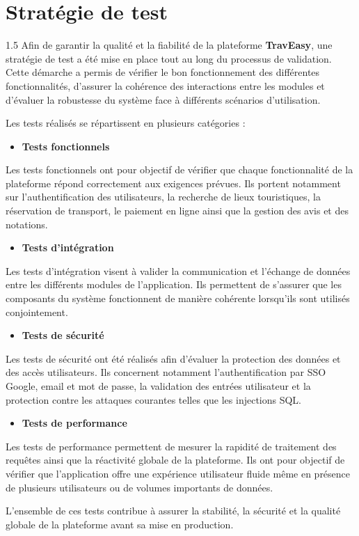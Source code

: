 \documentclass[a4paper,12pt]{report}
\begin{document}
\section{Stratégie de test}
\vspace{0.5cm}
\begin{spacing}{1.5}
\justifying
Afin de garantir la qualité et la fiabilité de la plateforme \textbf{TravEasy}, une stratégie de test a été mise en place tout au long du processus de validation. Cette démarche a permis de vérifier le bon fonctionnement des différentes fonctionnalités, d'assurer la cohérence des interactions entre les modules et d'évaluer la robustesse du système face à différents scénarios d'utilisation.

Les tests réalisés se répartissent en plusieurs catégories :

\begin{itemize}
    \item \textbf{Tests fonctionnels}
\end{itemize}
Les tests fonctionnels ont pour objectif de vérifier que chaque fonctionnalité de la plateforme répond correctement aux exigences prévues. Ils portent notamment sur l'authentification des utilisateurs, la recherche de lieux touristiques, la réservation de transport, le paiement en ligne ainsi que la gestion des avis et des notations.
\begin{itemize}
    \item \textbf{Tests d'intégration}
\end{itemize}
Les tests d'intégration visent à valider la communication et l'échange de données entre les différents modules de l'application. Ils permettent de s'assurer que les composants du système fonctionnent de manière cohérente lorsqu'ils sont utilisés conjointement.
\begin{itemize}
    \item \textbf{Tests de sécurité}
\end{itemize}
Les tests de sécurité ont été réalisés afin d'évaluer la protection des données et des accès utilisateurs. Ils concernent notamment l'authentification par SSO Google, email et mot de passe, la validation des entrées utilisateur et la protection contre les attaques courantes telles que les injections SQL.
\begin{itemize}
    \item \textbf{Tests de performance}
\end{itemize}
Les tests de performance permettent de mesurer la rapidité de traitement des requêtes ainsi que la réactivité globale de la plateforme. Ils ont pour objectif de vérifier que l'application offre une expérience utilisateur fluide même en présence de plusieurs utilisateurs ou de volumes importants de données.

L'ensemble de ces tests contribue à assurer la stabilité, la sécurité et la qualité globale de la plateforme avant sa mise en production.

\end{spacing}
\end{document}
